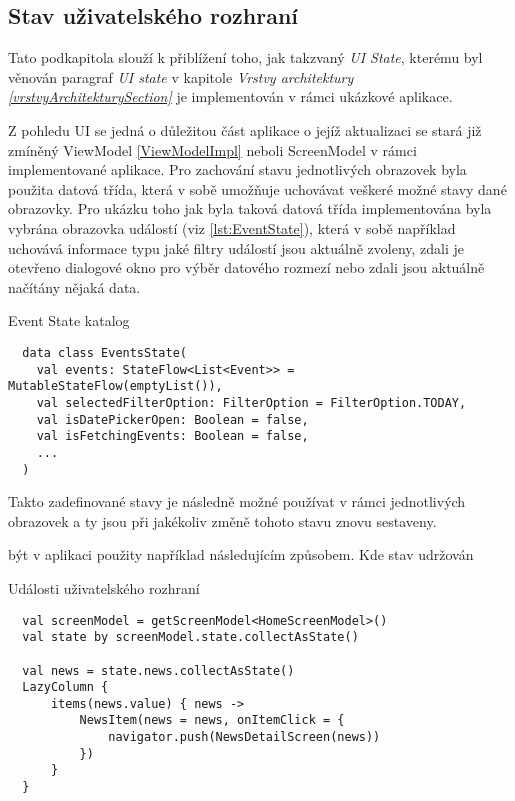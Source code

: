 
\subsection{Stav uživatelského rozhraní} \label{stateHandlingImpl}
Tato podkapitola slouží k přiblížení toho, jak takzvaný \textit{UI State}, kterému byl věnován paragraf \textit{UI state} v 
kapitole \textit{Vrstvy architektury \ref{vrstvyArchitekturySection} } je implementován v rámci ukázkové aplikace.

Z pohledu UI se jedná o důležitou část aplikace o jejíž aktualizaci se stará již zmíněný ViewModel \ref{ViewModelImpl} neboli ScreenModel v rámci
implementované aplikace. 
Pro zachování stavu jednotlivých obrazovek byla použita datová třída, která v sobě umožňuje uchovávat veškeré možné stavy dané obrazovky.
Pro ukázku toho jak byla taková datová třída implementována byla vybrána obrazovka událostí (viz \ref{lst:EventState}), která v sobě 
například uchovává informace typu jaké filtry událostí jsou aktuálně zvoleny, zdali je otevřeno dialogové okno pro výběr datového rozmezí 
nebo zdali jsou aktuálně načítány nějaká data.
\begin{listing}[H]
\caption{Event State katalog}\label{lst:EventState}
\begin{verbatim}
  data class EventsState(
    val events: StateFlow<List<Event>> = MutableStateFlow(emptyList()),
    val selectedFilterOption: FilterOption = FilterOption.TODAY,
    val isDatePickerOpen: Boolean = false,
    val isFetchingEvents: Boolean = false,
    ...
  )
\end{verbatim}
\end{listing}

Takto zadefinované stavy je následně možné používat v rámci jednotlivých obrazovek a ty jsou při jakékoliv změně tohoto stavu znovu sestaveny.

být v aplikaci použity například následujícím způsobem. Kde stav udržován 
\begin{listing}[H]
\caption{Události uživatelského rozhraní}\label{lst:StateImpl}
\begin{verbatim}
  val screenModel = getScreenModel<HomeScreenModel>()
  val state by screenModel.state.collectAsState()

  val news = state.news.collectAsState()
  LazyColumn {
      items(news.value) { news ->
          NewsItem(news = news, onItemClick = {
              navigator.push(NewsDetailScreen(news))
          })
      }
  }
\end{verbatim}
\end{listing}

